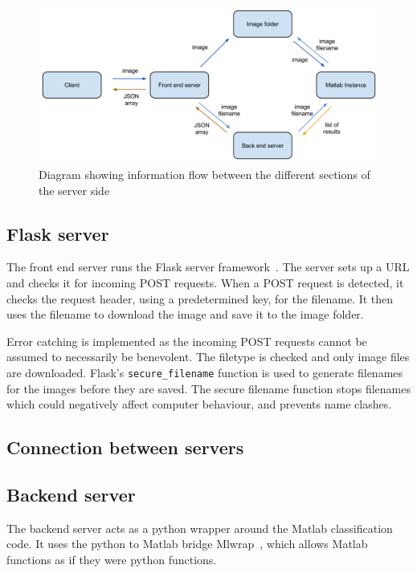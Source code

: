 \documentclass[11pt, a4paper]{report}
\begin{document}
\begin{figure}[hbt]
	\centering
  \includegraphics[totalheight=8cm]{img/07.png}
  \caption{Diagram showing information flow between the different sections of the server side}
  \label{svg:01}
\end{figure}

\subsection{Flask server}

The front end server runs the Flask server framework~\cite{Server:Flask}. The server sets up a URL and checks it for incoming POST requests. When a POST request is detected, it checks the request header, using a predetermined key, for the filename. It then uses the filename to download the image and save it to the image folder. 

Error catching is implemented as the incoming POST requests cannot be assumed to necessarily be benevolent. The filetype is checked and only image files are downloaded. Flask's \verb|secure_filename| function is used to generate filenames for the images before they are saved. The secure filename function stops filenames which could negatively affect computer behaviour, and prevents name clashes.

\subsection{Connection between servers}

\subsection{Backend server}

The backend server acts as a python wrapper around the Matlab classification code. It uses the python to Matlab bridge Mlwrap~\cite{Server:Mlwrap}, which allows Matlab functions as if they were python functions. 
\end{document}
